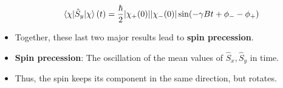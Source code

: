 \documentclass[../notes.tex]{subfiles}
\begin{document}
\begin{itemize}
\begin{equation*}
        \ev{\hat{S}_y}{\chi}(t) = \frac{\hbar}{2}|\chi_+(0)||\chi_-(0)|\sin(-\gamma Bt+\phi_--\phi_+)
    \end{equation*}
    \item Together, these last two major results lead to \textbf{spin precession}.
    \item \textbf{Spin precession}: The oscillation of the mean values of $\hat{S}_x,\hat{S}_y$ in time.
    \item Thus, the spin keeps its component in the same direction, but rotates.
    \begin{figure}[H]
        \centering
\end{figure}
\end{itemize}
\end{document}
